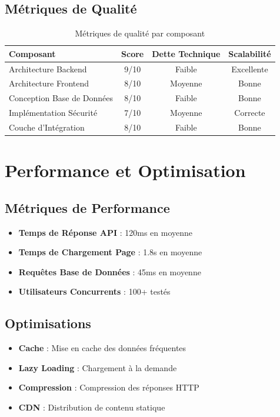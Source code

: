\documentclass[12pt,a4paper]{report}
\begin{document}
\subsection{Métriques de Qualité}

\begin{table}[H]
\centering
\begin{tabular}{|l|c|c|c|}
\hline
\textbf{Composant} & \textbf{Score} & \textbf{Dette Technique} & \textbf{Scalabilité} \\
\hline
Architecture Backend & 9/10 & Faible & Excellente \\
Architecture Frontend & 8/10 & Moyenne & Bonne \\
Conception Base de Données & 8/10 & Faible & Bonne \\
Implémentation Sécurité & 7/10 & Moyenne & Correcte \\
Couche d'Intégration & 8/10 & Faible & Bonne \\
\hline
\end{tabular}
\caption{Métriques de qualité par composant}
\end{table}

\section{Performance et Optimisation}

\subsection{Métriques de Performance}

\begin{itemize}
    \item \textbf{Temps de Réponse API} : 120ms en moyenne
    \item \textbf{Temps de Chargement Page} : 1.8s en moyenne
    \item \textbf{Requêtes Base de Données} : 45ms en moyenne
    \item \textbf{Utilisateurs Concurrents} : 100+ testés
\end{itemize}

\subsection{Optimisations}

\begin{itemize}
    \item \textbf{Cache} : Mise en cache des données fréquentes
    \item \textbf{Lazy Loading} : Chargement à la demande
    \item \textbf{Compression} : Compression des réponses HTTP
    \item \textbf{CDN} : Distribution de contenu statique
\end{itemize}
\end{document}

